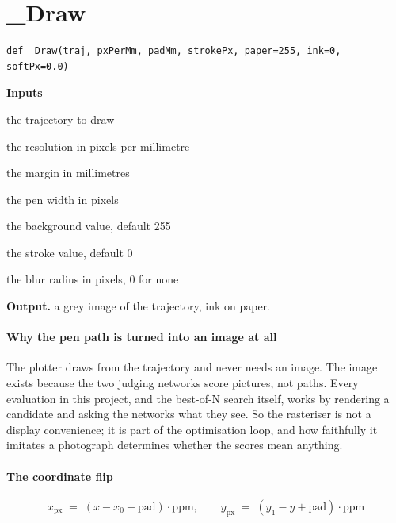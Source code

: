 \section{\_Draw}
\begin{lstlisting}[style=sig]
def _Draw(traj, pxPerMm, padMm, strokePx, paper=255, ink=0, softPx=0.0)
\end{lstlisting}

\noindent\textbf{Inputs}
\begin{description}[leftmargin=2.2em,style=nextline,font=\normalfont\ttfamily]\setlength\itemsep{1pt}
  \item[{traj}] \normalfont the trajectory to draw
  \item[{pxPerMm}] \normalfont the resolution in pixels per millimetre
  \item[{padMm}] \normalfont the margin in millimetres
  \item[{strokePx}] \normalfont the pen width in pixels
  \item[{paper}] \normalfont the background value, default 255
  \item[{ink}] \normalfont the stroke value, default 0
  \item[{softPx}] \normalfont the blur radius in pixels, 0 for none
\end{description}

\noindent\textbf{Output.} a grey image of the trajectory, ink on paper.


\paragraph{Why the pen path is turned into an image at all}
The plotter draws from the trajectory and never needs an image. The image exists because the two judging networks score pictures, not paths. Every evaluation in this project, and the best-of-N search itself, works by rendering a candidate and asking the networks what they see. So the rasteriser is not a display convenience; it is part of the optimisation loop, and how faithfully it imitates a photograph determines whether the scores mean anything.


\paragraph{The coordinate flip}

\begin{equation}
x_{\mathrm{px}} \;=\; (x - x_0 + \mathrm{pad}) \cdot \mathrm{ppm}, \qquad y_{\mathrm{px}} \;=\; (y_1 - y + \mathrm{pad}) \cdot \mathrm{ppm}
\end{equation}

